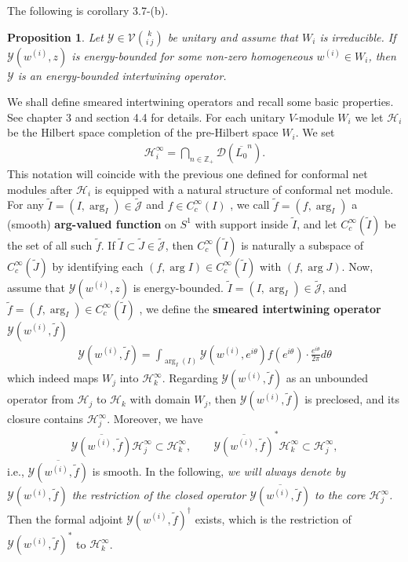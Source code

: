 \documentclass[12pt,a4paper]{article}
\theoremstyle{definition}
\theoremstyle{plain}
\newtheorem{pp}[df]{Proposition}
\newcommand{\mc}{\mathcal}
\newcommand{\wtd}{\widetilde}
\newcommand{\ovl}{\overline}
\newcommand{\Dom}{\scr D}
\newcommand{\scr}{\mathscr}
\newcommand{\Jtd}{\widetilde{\mathcal J}}
\newcommand{\mbb}{\mathbb}
\numberwithin{equation}{subsection}
\begin{document}
The following is \cite{Gui19a} corollary 3.7-(b).

\begin{pp}\label{lb53}
Let $\mc Y\in\mc V{k\choose i~j}$ be unitary and assume that $W_i$ is irreducible. If $\mc Y(w^{(i)},z)$ is energy-bounded for some non-zero homogeneous $w^{(i)}\in W_i$, then $\mc Y$ is an energy-bounded intertwining operator.
\end{pp}

We shall define smeared intertwining operators and recall some basic properties. See \cite{Gui19a} chapter 3 and \cite{Gui21a} section 4.4 for details. For each unitary $V$-module $W_i$ we let $\mc H_i$ be the Hilbert space completion of the pre-Hilbert space $W_i$. We set 
\begin{align*}
\mc H_i^\infty=\bigcap_{n\in\mbb Z_+}\Dom(\ovl{L_0}^n).
\end{align*}
This notation will coincide with the previous one defined for conformal net modules after $\mc H_i$ is equipped with a natural structure of conformal net module. For any $\wtd I=(I,\arg_I)\in\Jtd$ and $f\in C^\infty_c(I)$ , we call $\wtd f=(f,\arg_I)$ a (smooth) \textbf{arg-valued function} on $S^1$ with support inside $\wtd I$, and let $C^\infty_c(\wtd I)$ be the set of all such $\wtd f$.  If $\wtd I\subset\wtd J\in\Jtd$, then $C^\infty_c(\wtd I)$ is naturally a subspace of $C^\infty_c(\wtd J)$ by identifying each $(f,\arg I)\in C^\infty_c(\wtd I)$ with $(f,\arg J)$. Now, assume that $\mc Y(w^{(i)},z)$ is energy-bounded. $\wtd I=(I,\arg_I)\in\Jtd$, and $\wtd f=(f,\arg_I)\in C^\infty_c(\wtd I)$ , we  define the \textbf{smeared intertwining operator} $\mc Y(w^{(i)},\wtd f)$ 
\begin{align}
\mc Y(w^{(i)},\wtd f)=\int_{\arg_I(I)}\mc Y(w^{(i)},e^{i\theta})f(e^{i\theta})\cdot\frac{e^{i\theta}}{2\pi}d\theta
\end{align}
which indeed maps $W_j$ into $\mc H_k^\infty$.
Regarding $\mc Y(w^{(i)},\wtd f)$ as an unbounded operator from $\mc H_j$ to $\mc H_k$ with domain $W_j$, then $\mc Y(w^{(i)},\wtd f)$ is preclosed, and its closure  contains $\mc H_j^\infty$. Moreover, we have
\begin{gather*}
\ovl{\mc Y(w^{(i)},\wtd f)}\mc H_j^\infty\subset\mc H_k^\infty,\qquad \ovl{\mc Y(w^{(i)},\wtd f)}^*\mc H_k^\infty\subset\mc H_j^\infty,
\end{gather*}
i.e., $\ovl{\mc Y(w^{(i)},\wtd f)}$ is smooth. In the following, \emph{we will always denote by $\mc Y(w^{(i)},\wtd f)$ the restriction of the closed operator $\ovl{\mc Y(w^{(i)},\wtd f)}$ to the core $\mc H_j^\infty$.} Then the formal adjoint $\mc Y(w^{(i)},\wtd f)^\dagger$ exists, which is the restriction of $\mc Y(w^{(i)},\wtd f)^*$ to $\mc H_k^\infty$.
\end{document}
